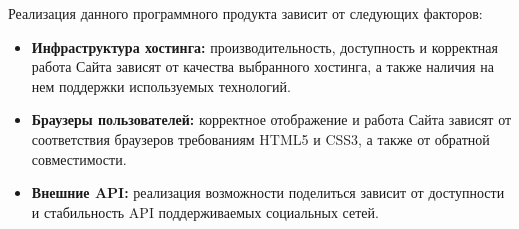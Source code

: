 
Реализация данного программного продукта зависит от следующих факторов:

\begin{itemize}
    \item \textbf{Инфраструктура хостинга:} производительность, доступность и корректная работа Сайта зависят от качества выбранного хостинга, а также наличия на нем поддержки используемых технологий.
    \item \textbf{Браузеры пользователей:} корректное отображение и работа Сайта зависят от соответствия браузеров требованиям HTML5 и CSS3, а также от обратной совместимости.
    \item \textbf{Внешние API:} реализация возможности поделиться зависит от доступности и стабильность API поддерживаемых социальных сетей. 
\end{itemize}